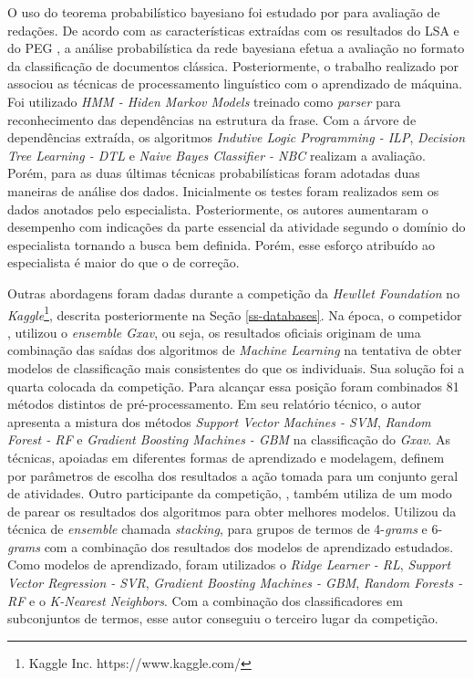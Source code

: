 O uso do teorema probabilístico bayesiano foi estudado por  para avaliação de redações. De acordo com as características extraídas com os resultados do LSA \cite{landauer1998} e do PEG \cite{page1968}, a análise probabilística da rede bayesiana efetua a avaliação no formato da classificação de documentos clássica. Posteriormente, o trabalho realizado por  associou as técnicas de processamento linguístico com o aprendizado de máquina. Foi utilizado \textit{HMM - Hiden Markov Models} treinado como \textit{parser} para reconhecimento das dependências na estrutura da frase. Com a árvore de dependências extraída, os algoritmos \textit{Indutive Logic Programming - ILP}, \textit{Decision Tree Learning - DTL} e \textit{Naive Bayes Classifier - NBC} realizam a avaliação. Porém, para as duas últimas técnicas probabilísticas foram adotadas duas maneiras de análise dos dados. Inicialmente os testes foram realizados sem os dados anotados pelo especialista. Posteriormente, os autores aumentaram o desempenho com indicações da parte essencial da atividade segundo o domínio do especialista tornando a busca bem definida. Porém, esse esforço atribuído ao especialista é maior do que o de correção.

Outras abordagens foram dadas durante a competição da \textit{Hewllet Foundation} no \textit{Kaggle}\footnote{Kaggle Inc. https://www.kaggle.com/}, descrita posteriormente na Seção \ref{ss-databases}. Na época, o competidor , utilizou o \textit{ensemble Gxav}, ou seja, os resultados oficiais originam de uma combinação das saídas dos algoritmos de \textit{Machine Learning} na tentativa de obter modelos de classificação mais consistentes do que os individuais. Sua solução foi a quarta colocada da competição. Para alcançar essa posição foram combinados  81 métodos distintos de pré-processamento. Em seu relatório técnico, o autor apresenta a mistura dos métodos \textit{Support Vector Machines - SVM}, \textit{Random Forest - RF} e \textit{Gradient Boosting Machines - GBM} na classificação do \textit{Gxav}. As técnicas, apoiadas em diferentes formas de aprendizado e modelagem, definem por parâmetros de escolha dos resultados a ação tomada para um conjunto geral de atividades. Outro participante da competição, , também utiliza de um modo de parear os resultados dos algoritmos para obter melhores modelos. Utilizou da técnica de \textit{ensemble} chamada \textit{stacking}, para grupos de termos de 4-\textit{grams} e 6-\textit{grams} com a combinação dos resultados dos modelos de aprendizado estudados. Como modelos de aprendizado, foram utilizados o \textit{Ridge Learner - RL}, \textit{Support Vector Regression - SVR}, \textit{Gradient Boosting Machines - GBM}, \textit{Random Forests - RF} e o \textit{K-Nearest Neighbors}. Com a combinação dos classificadores em subconjuntos de termos, esse autor conseguiu o terceiro lugar da competição.

